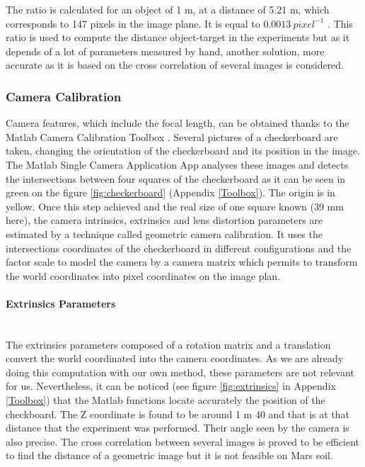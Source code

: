 The ratio is calculated for an object of 1 m, at a distance of 5.21 m, which corresponds to 147 pixels in the image plane. It is equal to $0.0013 \ pixel^{-1}$ . This ratio is used to compute the distance object-target in the experiments but as it depends of a lot of parameters measured by hand, another solution, more accurate as it is based on the cross correlation of several images is considered. 

\subsubsection{Camera Calibration}
Camera features, which include the focal length, can be obtained thanks to the Matlab Camera Calibration Toolbox \cite{matlabtoolbox}. Several pictures of a checkerboard are taken, changing the orientation of the checkerboard and its position in the image. The Matlab Single Camera Application App analyses these images and detects the intersections between four squares of the checkerboard as it can be seen in green on the figure \ref{fig:checkerboard} (Appendix \ref{Toolbox}). The origin is in yellow. Once this step achieved and the real size of one square known (39 mm here), the camera intrinsics, extrinsics and lens distortion parameters are estimated by a technique called geometric camera calibration. It uses the intersections coordinates of the checkerboard in different configurations and the factor scale to model the camera by a camera matrix which permits to transform the world coordinates into pixel coordinates on the image plan.

\paragraph*{Extrinsics Parameters}
~\\
The extrinsics parameters composed of a rotation matrix and a translation convert the world coordinated into the camera coordinates. As we are already doing this computation with our own method, these parameters are not relevant for us. Nevertheless, it can be noticed (see figure \ref{fig:extrinsics} in Appendix \ref{Toolbox}) that the Matlab functions locate accurately the position of the checkboard. The Z coordinate is found to be around 1 m 40 and that is at that distance that the experiment was performed. Their angle seen by the camera is also precise. The cross correlation between several images is proved to be efficient to find the distance of a geometric image but it is not feasible on Mars soil.

